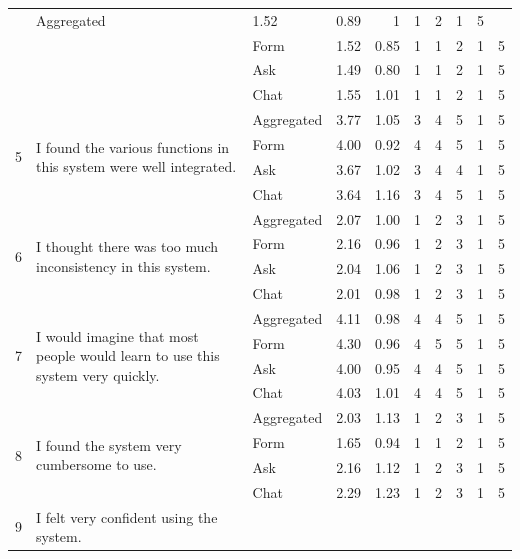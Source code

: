 \begin{table}
\begin{tabularx}{\linewidth}{@{}c X l r r r r r r r@{}}
                    & Aggregated  & 1.52 & 0.89 & 1 & 1 & 2 & 1 & 5 \\
                    & & Form & 1.52 & 0.85 & 1 & 1 & 2 & 1 & 5 \\
                    & & Ask  & 1.49 & 0.80 & 1 & 1 & 2 & 1 & 5 \\
                    & & Chat & 1.55 & 1.01 & 1 & 1 & 2 & 1 & 5 \\
\midrule
\multirow{4}{*}{5}  & \multirow{4}{*}{I found the various functions in this system were well integrated.}
                    & Aggregated  & 3.77 & 1.05 & 3 & 4 & 5 & 1 & 5 \\
                    & & Form & 4.00 & 0.92 & 4 & 4 & 5 & 1 & 5 \\
                    & & Ask  & 3.67 & 1.02 & 3 & 4 & 4 & 1 & 5 \\
                    & & Chat & 3.64 & 1.16 & 3 & 4 & 5 & 1 & 5 \\
\midrule
\multirow{4}{*}{6}  & \multirow{4}{*}{I thought there was too much inconsistency in this system.}
                    & Aggregated  & 2.07 & 1.00 & 1 & 2 & 3 & 1 & 5 \\
                    & & Form & 2.16 & 0.96 & 1 & 2 & 3 & 1 & 5 \\
                    & & Ask  & 2.04 & 1.06 & 1 & 2 & 3 & 1 & 5 \\
                    & & Chat & 2.01 & 0.98 & 1 & 2 & 3 & 1 & 5 \\
\midrule
\multirow{4}{*}{7}  & \multirow{4}{*}{I would imagine that most people would learn to use this system very quickly.}
                    & Aggregated  & 4.11 & 0.98 & 4 & 4 & 5 & 1 & 5 \\
                    & & Form & 4.30 & 0.96 & 4 & 5 & 5 & 1 & 5 \\
                    & & Ask  & 4.00 & 0.95 & 4 & 4 & 5 & 1 & 5 \\
                    & & Chat & 4.03 & 1.01 & 4 & 4 & 5 & 1 & 5 \\
\midrule
\multirow{4}{*}{8}  & \multirow{4}{*}{I found the system very cumbersome to use.}
                    & Aggregated  & 2.03 & 1.13 & 1 & 2 & 3 & 1 & 5 \\
                    & & Form & 1.65 & 0.94 & 1 & 1 & 2 & 1 & 5 \\
                    & & Ask  & 2.16 & 1.12 & 1 & 2 & 3 & 1 & 5 \\
                    & & Chat & 2.29 & 1.23 & 1 & 2 & 3 & 1 & 5 \\
\midrule
\multirow{4}{*}{9}  & \multirow{4}{*}{I felt very confident using the system.}

\end{tabularx}
\end{table}
